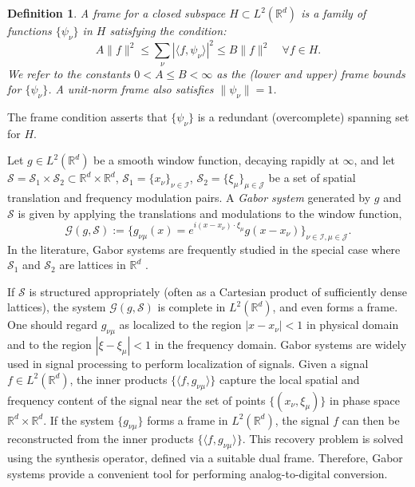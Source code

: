 \documentclass[conference]{IEEEtran}
\def\R{\mathbb{R}}
\newtheorem{definition}[theorem]{Definition}
\numberwithin{equation}{section}
\def\R{\mathbb{R}}
\begin{document}
\begin{definition}
A \emph{frame} for a closed subspace $H \subset L^2(\R^d)$ is a family of functions $\{\psi_\nu\}$ in $H$ satisfying the condition:
\[
A \| f \|^2 \leq \sum_\nu |\langle f, \psi_\nu \rangle|^2 \leq B\| f \|^2 \quad \forall f \in H.
\]
We refer to the constants $0 < A\leq B< \infty$ as the (lower and upper) \emph{frame bounds} for $\{\psi_\nu\}$. A \emph{unit-norm frame} also satisfies $\| \psi_\nu \| = 1$. 
\end{definition}

The frame condition asserts that $\{\psi_\nu\}$ is a redundant (overcomplete) spanning set for $H$.

Let \( g \in L^2(\mathbb{R}^d) \) be a smooth window function, decaying rapidly at $\infty$, and let $\mathcal{S} = \mathcal{S}_1 \times \mathcal{S}_2 \subset \R^d \times \R^d$, $\mathcal{S}_1 = \{x_\nu\}_{\nu \in \mathcal{I}}$, $\mathcal{S}_2=\{\xi_\mu\}_{\mu \in \mathcal{J}}$ be a set of spatial translation and frequency modulation pairs. A \emph{Gabor system} generated by $g$ and $\mathcal{S}$ is given by applying the translations and modulations to the window function,
\begin{equation}\label{eq:GaborSystem}
\mathcal{G}(g,\mathcal{S}) := \Big\{ g_{\nu\mu}(x) = e^{ i(x - x_\nu)\cdot \xi_\mu} g(x - x_\nu) \Big\}_{\nu \in \mathcal{I}, \mu \in \mathcal{J}}.  
\end{equation} 
In the literature, Gabor systems are frequently studied in the special case where $\mathcal{S}_1$ and $\mathcal{S}_2$ are lattices in $\R^d$ \cite{grochenig2001foundations}.

If $\mathcal{S}$ is structured appropriately (often as a Cartesian product of sufficiently dense lattices), the system $\mathcal{G}(g,\mathcal{S})$ is complete in $L^2(\R^d)$, and even forms a frame. One should regard $g_{\nu\mu}$ as localized to the region $|x-x_\nu| < 1$ in physical domain and to the region $|\xi - \xi_\mu| < 1$ in the frequency domain. 
Gabor systems are widely used in signal processing to perform localization of signals. Given a signal $f \in L^2(\R^d)$, the inner products $\{ \langle f, g_{\nu\mu} \rangle\}$ capture the local spatial and frequency content of the signal near the set of points $\{(x_\nu,\xi_\mu)\}$ in phase space $\R^d \times \R^d$. If the system $\{g_{\nu\mu}\}$ forms a frame in $L^2(\R^d)$, the signal $f$ can then be reconstructed from the inner products $\{\langle f,g_{\nu\mu}\rangle\}$. This recovery problem is solved using the synthesis operator, defined via a suitable dual frame. Therefore, Gabor systems provide a convenient tool for performing analog-to-digital conversion.
\end{document}
